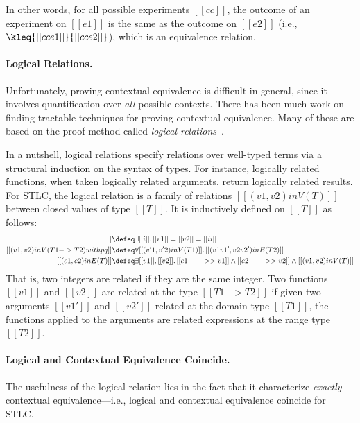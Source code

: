 In other words, for all possible experiments $[[ cc ]]$, the outcome of an
experiment on $[[e1]]$ is the same as the outcome on $[[e2]]$
(i.e., $\kleq{[[cc{e1}]]}{[[cc{e2}]]}$), which is an equivalence relation.


\paragraph{Logical Relations.}

Unfortunately, proving contextual equivalence is difficult in general, since it
involves quantification over \textit{all} possible contexts. There has been much
work on finding tractable techniques for proving contextual equivalence. Many
of these are based on the proof method called \emph{logical
  relations}~\citep{tait, plotkin1973lambda, statman1985logical}.

In a nutshell, logical relations specify relations over well-typed terms via a
structural induction on the syntax of types. For instance, logically related
functions, when taken logically related arguments, return logically related
results. For STLC, the logical relation is a family of relations $[[ (v1, v2) in V(T)  ]]$
between closed values of type $[[T]]$. It is inductively defined on $[[T]]$ as follows:
\begin{align*}
  [[(v1 , v2) in V ( nat ) with pq ]]  &\defeq  \exists [[i]].\, [[v1]] = [[v2]] = [[ii]] \\
  [[(v1 , v2) in V ( T1 -> T2 ) with pq ]]  & \defeq  \forall [[(v'1, v'2) in V (T1)  ]].\, [[  (v1 v1' , v2 v2') in E (T2)  ]] \\
  [[(e1, e2) in E (T)  ]] & \defeq \exists [[v1]], [[v2]].\, [[e1 -->> v1]] \land [[e2 -->> v2]] \land [[(v1, v2) in V (T) ]]
\end{align*}
That is, two integers are related if they are the same integer. Two functions
$[[v1]]$ and $[[v2]]$ are related at the type $[[T1 -> T2]]$ if given two
arguments $[[v1']]$ and $[[v2']]$ related at the domain type $[[T1]]$, the
functions applied to the arguments are related expressions at the range type
$[[T2]]$.


\paragraph{Logical and Contextual Equivalence Coincide.}

The usefulness of the logical relation lies in the fact that it characterize
\textit{exactly} contextual equivalence---i.e., logical and contextual equivalence
coincide for STLC.


